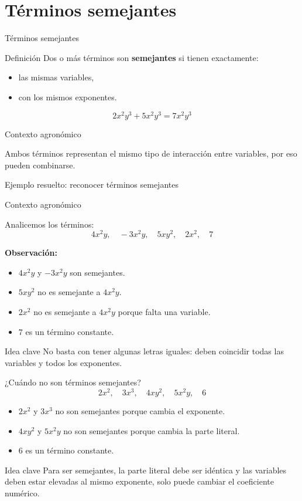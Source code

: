 \documentclass[handout,aspectratio=169,12pt]{beamer}
\newcommand{\IdeaClave}[1]{
	\begin{alertblock}{Idea clave}
		#1
	\end{alertblock}
}
\newcommand{\Agronomia}[1]{
	\begin{exampleblock}{Contexto agronómico}
		#1
	\end{exampleblock}
}
\begin{document}
	\section{Términos semejantes}
	\begin{frame}{Términos semejantes}
		\begin{block}{Definición}
			Dos o más términos son \textbf{semejantes} si tienen exactamente:
			\begin{itemize}
				\item las mismas variables,
				\pause
				\item con los mismos exponentes.
			\end{itemize}
		\end{block}
		
		\pause
		\[
		2x^2y^3 + 5x^2y^3 = 7x^2y^3
		\]
		
		\pause
		\Agronomia{
			Ambos términos representan el mismo tipo de interacción entre variables, por eso pueden combinarse.
		}
	\end{frame}
	
	\begin{frame}{Ejemplo resuelto: reconocer términos semejantes}
		\Agronomia{
			Analicemos los términos:
			\[
			4x^2y,\quad -3x^2y,\quad 5xy^2,\quad 2x^2,\quad 7
			\]
		}
		
		\pause
		\textbf{Observación:}
		\begin{itemize}
			\item \(4x^2y\) y \(-3x^2y\) son semejantes.
			\pause
			\item \(5xy^2\) no es semejante a \(4x^2y\).
			\pause
			\item \(2x^2\) no es semejante a \(4x^2y\) porque falta una variable.
			\pause
			\item \(7\) es un término constante.
		\end{itemize}
		
		\pause
		\IdeaClave{No basta con tener algunas letras iguales: deben coincidir todas las variables y todos los exponentes.}
	\end{frame}
	
	\begin{frame}{¿Cuándo no son términos semejantes?}
		\[
		2x^2,\quad 3x^3,\quad 4xy^2,\quad 5x^2y,\quad 6
		\]
		
		\pause
		\begin{itemize}
			\item \(2x^2\) y \(3x^3\) no son semejantes porque cambia el exponente.
			\pause
			\item \(4xy^2\) y \(5x^2y\) no son semejantes porque cambia la parte literal.
			\pause
			\item \(6\) es un término constante.
		\end{itemize}
		
		\pause
		\IdeaClave{Para ser semejantes, la parte literal debe ser idéntica y las variables deben estar elevadas al mismo exponente, solo puede cambiar el coeficiente numérico.}
	\end{frame}
	
\end{document}
